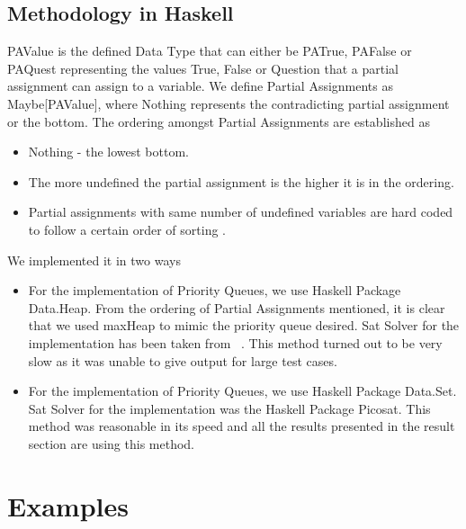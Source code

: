 \documentclass{article}
\theoremstyle{plain}
\begin{document}
\subsection{Methodology in Haskell}
PAValue is the defined Data Type that can either be PATrue, PAFalse or PAQuest representing the values True, False or Question that a partial assignment can assign to a variable. We define Partial Assignments as Maybe[PAValue], where Nothing represents the contradicting partial assignment or the bottom. The ordering amongst Partial Assignments are established as 
\begin{itemize}
\item Nothing - the lowest bottom.
\item The more undefined the partial assignment is the higher it is in the ordering.
\item Partial assignments with same number of undefined variables are hard coded to follow a certain order of sorting \label{ordering}.
\end{itemize} 
We implemented it in two ways
\begin{itemize}
\item For the implementation of Priority Queues, we use Haskell Package Data.Heap. From the ordering of Partial Assignments mentioned, it is clear that we used maxHeap to mimic the priority queue desired. Sat Solver for the implementation has been taken from ~\cite{sat.hs}. This method turned out to be very slow as it was unable to give output for large test cases.
\item For the implementation of Priority Queues, we use Haskell Package Data.Set. Sat Solver for the implementation was the Haskell Package Picosat. This method was reasonable in its speed and all the results presented in the result section are using this method.
\end{itemize} 

\section{Examples}
\end{document}
